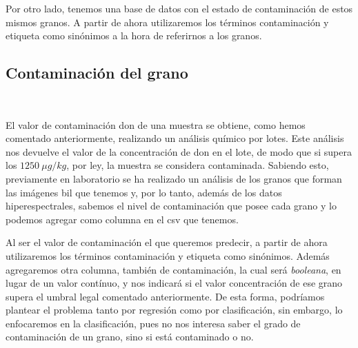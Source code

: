 Por otro lado, tenemos una base de datos con el estado de contaminación de estos mismos granos. A partir de ahora utilizaremos los términos contaminación y etiqueta como sinónimos a la hora de referirnos a los granos.


\subsection{Contaminación del grano}\ \label{sec:separacion}

El valor de contaminación \acrshort{don} de una muestra se obtiene, como hemos comentado anteriormente, realizando un análisis químico por lotes. Este análisis nos devuelve el valor de la concentración de \acrshort{don} en el lote, de modo que si supera los \(1250\ \mu g/kg\), por ley, la muestra se considera contaminada. Sabiendo esto, previamente en laboratorio se ha realizado un análisis de los granos que forman las imágenes \acrshort{bil} que tenemos y, por lo tanto, además de los datos hiperespectrales, sabemos el nivel de contaminación que posee cada grano y lo podemos agregar como columna en el \acrshort{csv} que tenemos.


Al ser el valor de contaminación el que queremos predecir, a partir de ahora utilizaremos los términos contaminación y etiqueta como sinónimos. Además agregaremos otra columna, también de contaminación, la cual será \textit{booleana}, en lugar de un valor contínuo, y nos indicará si el valor concentración de ese grano supera el umbral legal comentado anteriormente. De esta forma, podríamos plantear el problema tanto por regresión como por clasificación, sin embargo, lo enfocaremos en la clasificación, pues no nos interesa saber el grado de contaminación de un grano, sino si está contaminado o no. 
